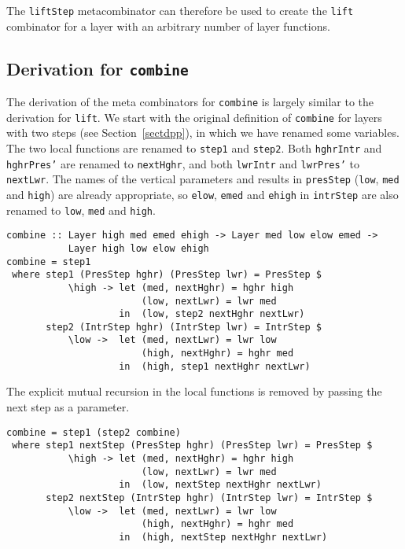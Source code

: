 The \texttt{liftStep} metacombinator can therefore be used to create the \texttt{lift} combinator for a layer with an arbitrary number of layer functions.


%																
\subsection{Derivation for \texttt{combine}} \label{subsubsectcombine}

The derivation of the meta combinators for \texttt{combine} is largely similar to the derivation for \texttt{lift}. We start with the original definition of \texttt{combine} for layers with two steps (see Section~\ref{sectdpp}), in which we have renamed some variables. The two local functions are renamed to \texttt{step1} and \texttt{step2}. Both \texttt{hghrIntr} and \texttt{hghrPres'} are renamed to \texttt{nextHghr}, and both \texttt{lwrIntr} and \texttt{lwrPres'} to \texttt{nextLwr}. The names of the vertical parameters and results in \texttt{presStep} (\texttt{low}, \texttt{med} and \texttt{high}) are already appropriate, so \texttt{elow}, \texttt{emed} and \texttt{ehigh} in \texttt{intrStep} are also renamed to \texttt{low}, \texttt{med} and \texttt{high}.

\begin{small}
\begin{verbatim}
combine :: Layer high med emed ehigh -> Layer med low elow emed -> 
           Layer high low elow ehigh
combine = step1
 where step1 (PresStep hghr) (PresStep lwr) = PresStep $
           \high -> let (med, nextHghr) = hghr high
                        (low, nextLwr) = lwr med
                    in  (low, step2 nextHghr nextLwr)
       step2 (IntrStep hghr) (IntrStep lwr) = IntrStep $
           \low ->  let (med, nextLwr) = lwr low
                        (high, nextHghr) = hghr med
                    in  (high, step1 nextHghr nextLwr)
\end{verbatim}
\end{small}

The explicit mutual recursion in the local functions is removed by passing the next step as a parameter.

\begin{small}
\begin{verbatim}
combine = step1 (step2 combine)
 where step1 nextStep (PresStep hghr) (PresStep lwr) = PresStep $
           \high -> let (med, nextHghr) = hghr high
                        (low, nextLwr) = lwr med
                    in  (low, nextStep nextHghr nextLwr)
       step2 nextStep (IntrStep hghr) (IntrStep lwr) = IntrStep $
           \low ->  let (med, nextLwr) = lwr low
                        (high, nextHghr) = hghr med
                    in  (high, nextStep nextHghr nextLwr)
\end{verbatim}
\end{small}

